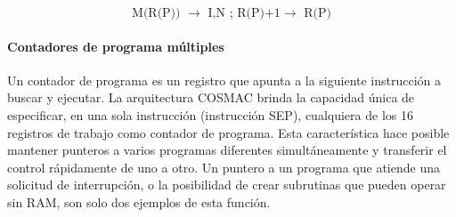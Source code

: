 \begin{equation*}
    \text{ M(R(P)) } \rightarrow \text{ I,N ; R(P)+1} \rightarrow \text{ R(P) }
\end{equation*}

\paragraph{Contadores de programa múltiples}

Un contador de programa es un registro que apunta a la siguiente instrucción a buscar y ejecutar. La arquitectura COSMAC brinda la capacidad única de especificar, en una sola instrucción (instrucción SEP), cualquiera de los 16 registros de trabajo como contador de programa. Esta característica hace posible mantener punteros a varios programas diferentes simultáneamente y transferir el control rápidamente de uno a otro. Un puntero a un programa que atiende una solicitud de interrupción, o la posibilidad de crear subrutinas que pueden operar sin RAM, son solo dos ejemplos de esta función.

